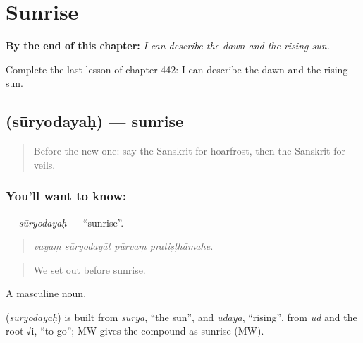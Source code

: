 
\chapter{Sunrise}
\label{ch:sa-sunrise}

\begin{chapteropening}
\textbf{By the end of this chapter:} \emph{I can describe the dawn and the rising sun.}

Complete the last lesson of chapter 442: I can describe the dawn and the rising sun.
\end{chapteropening}

\section[\texorpdfstring{\sk{सूर्योदयः} (sūryodayaḥ)}{सूर्योदयः (sūryodayaḥ)}]{ (sūryodayaḥ) — sunrise}

\label{lesson:SA-C442-suryodayah}



\begin{quote}
Before the new one: say the Sanskrit for hoarfrost, then the Sanskrit for veils.
\end{quote}

\subsection*{You'll want to know: }
\textbf{} — \emph{sūryodayaḥ} — \textquotedblleft{}sunrise\textquotedblright{}.

\begin{quote}
   
\end{quote}

\begin{quote}
\emph{vayaṃ sūryodayāt pūrvaṃ pratiṣṭhāmahe.}
\end{quote}

\begin{quote}
We set out before sunrise.
\end{quote}

A masculine noun.

\begin{cousinweb}
\textbf{} (\emph{sūryodayaḥ}) is built from \emph{sūrya}, \textquotedblleft{}the sun\textquotedblright{}, and \emph{udaya}, \textquotedblleft{}rising\textquotedblright{}, from \emph{ud} and the root √i, \textquotedblleft{}to go\textquotedblright{}; MW gives the compound as sunrise (MW).
\end{cousinweb}

